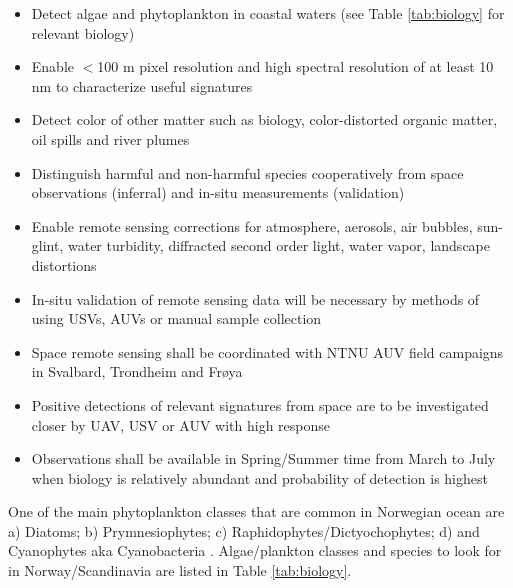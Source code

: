 \begin{itemize}
\item Detect algae and phytoplankton in coastal waters (see Table \ref{tab:biology} for relevant biology)
\item Enable $<$100 m pixel resolution and high spectral resolution of at least 10 nm to characterize useful signatures
\item Detect color of other matter such as biology, color-distorted organic matter, oil spills and river plumes
\item Distinguish harmful and non-harmful species cooperatively from space observations (inferral) and in-situ measurements (validation)
\item Enable remote sensing corrections for atmosphere, aerosols, air bubbles, sun-glint, water turbidity, diffracted second order light, water vapor, landscape distortions
\item In-situ validation of remote sensing data will be necessary by methods of using USVs, AUVs or manual sample collection
\item Space remote sensing shall be coordinated with NTNU AUV field campaigns in Svalbard, Trondheim and Fr{\o}ya
\item Positive detections of relevant signatures from space are to be investigated closer by UAV, USV or AUV with high response
\item Observations shall be available in Spring/Summer time from March to July when biology is relatively abundant and probability of detection is highest
\end{itemize}
One of the main phytoplankton classes that are common in Norwegian ocean are a) Diatoms; b) Prymnesiophytes; c) Raphidophytes/Dictyochophytes; d) and Cyanophytes aka Cyanobacteria  \cite{Geir2011}. Algae/plankton classes and species to look for in Norway/Scandinavia are listed in Table \ref{tab:biology}.

